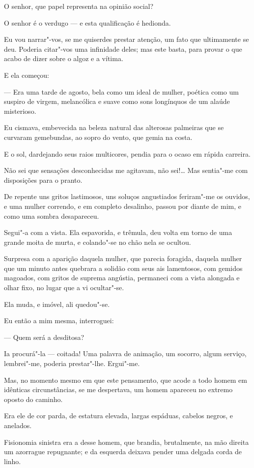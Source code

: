 O senhor, que papel representa na opinião social?

O senhor é o verdugo --- e esta qualificação é hedionda.

Eu vou narrar"-vos, se me quiserdes prestar atenção, um fato que
ultimamente se deu. Poderia citar"-vos uma infinidade deles; mas este
basta, para provar o que acabo de dizer sobre o algoz e a vítima.

E ela começou:

--- Era uma tarde de agosto, bela como um ideal de mulher, poética como
um suspiro de virgem, melancólica e suave como sons longínquos de um
alaúde misterioso.

Eu cismava, embevecida na beleza natural das alterosas palmeiras que se
curvaram gemebundas, ao sopro do vento, que gemia na costa.

E o sol, dardejando seus raios multicores, pendia para o ocaso em rápida
carreira.

Não sei que sensações desconhecidas me agitavam, não sei!\ldots{} Mas
sentia"-me com disposições para o pranto.

De repente uns gritos lastimosos, uns soluços angustiados feriram"-me os
ouvidos, e uma mulher correndo, e em completo desalinho, passou por
diante de mim, e como uma sombra desapareceu.

Segui"-a com a vista. Ela espavorida, e trêmula, deu volta em torno de
uma grande moita de murta, e colando"-se no chão nela se ocultou.

Surpresa com a aparição daquela mulher, que parecia foragida, daquela
mulher que um minuto antes quebrara a solidão com seus ais lamentosos,
com gemidos magoados, com gritos de suprema angústia, permaneci com a
vista alongada e olhar fixo, no lugar que a vi ocultar"-se.

Ela muda, e imóvel, ali quedou"-se.

Eu então a mim mesma, interroguei:

--- Quem será a desditosa?

Ia procurá"-la --- coitada! Uma palavra de animação, um socorro, algum
serviço, lembrei"-me, poderia prestar"-lhe. Ergui"-me.

Mas, no momento mesmo em que este pensamento, que acode a todo homem em
idênticas circunstâncias, se me despertava, um homem apareceu no extremo
oposto do caminho.

Era ele de cor parda, de estatura elevada, largas espáduas, cabelos
negros, e anelados.

Fisionomia sinistra era a desse homem, que brandia, brutalmente, na mão
direita um azorrague repugnante; e da esquerda deixava pender uma
delgada corda de linho.

